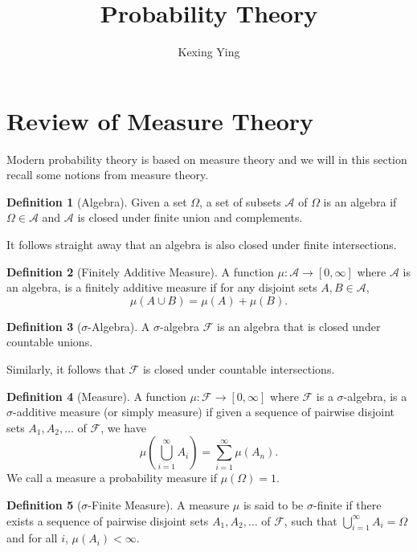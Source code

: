 \documentclass[]{article}
\title{Probability Theory}
\author{Kexing Ying}
\theoremstyle{definition}
\theoremstyle{definition}
\newtheorem{definition}{Definition}[section]
\begin{document}
\maketitle

{
\hypersetup{linkcolor=}
\setcounter{tocdepth}{2}
\tableofcontents
}
\newpage

\section{Review of Measure Theory}

Modern probability theory is based on measure theory and we will in this section 
recall some notions from measure theory.

\begin{definition}[Algebra]
  Given a set \(\Omega\), a set of subsets \(\mathcal{A}\) of \(\Omega\) is an 
  algebra if \(\Omega \in \mathcal{A}\) and \(\mathcal{A}\) is closed under 
  finite union and complements.

  It follows straight away that an algebra is also closed under finite intersections.
\end{definition}

\begin{definition}[Finitely Additive Measure]
  A function \(\mu : \mathcal{A} \to [0, \infty]\) where \(\mathcal{A}\) is an algebra, 
  is a finitely additive measure if for any disjoint sets \(A, B \in \mathcal{A}\),
  \[\mu(A \cup B) = \mu(A) + \mu(B).\]
\end{definition}

\begin{definition}[\(\sigma\)-Algebra]
  A \(\sigma\)-algebra \(\mathcal{F}\) is an algebra that is closed under countable 
  unions.

  Similarly, it follows that \(\mathcal{F}\) is closed under countable intersections.
\end{definition}

\begin{definition}[Measure]
  A function \(\mu : \mathcal{F} \to [0, \infty]\) where \(\mathcal{F}\) is a 
  \(\sigma\)-algebra, is a \(\sigma\)-additive measure (or simply measure)
  if given a sequence of pairwise disjoint sets \(A_1, A_2, \dots\) of \(\mathcal{F}\), 
  we have 
  \[\mu\left(\bigcup_{i = 1}^\infty A_i\right) = \sum_{i = 1}^\infty \mu(A_n).\]
  We call a measure a probability measure if \(\mu(\Omega) = 1\).
\end{definition}

\begin{definition}[\(\sigma\)-Finite Measure]
  A measure \(\mu\) is said to be \(\sigma\)-finite if there exists a sequence of 
  pairwise disjoint sets \(A_1, A_2, \dots\) of \(\mathcal{F}\), such that 
  \(\bigcup_{i = 1}^\infty A_i = \Omega\) and for all \(i\), \(\mu(A_i) < \infty\).
\end{definition}
\end{document}
